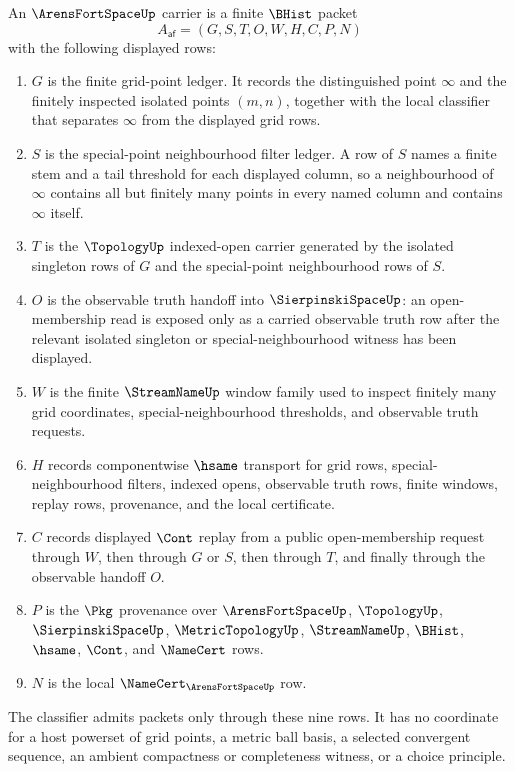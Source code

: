 \begin{definition}
\label{def:arens-fort-space-carrier}
An $\ArensFortSpaceUp$ carrier is a finite $\BHist$ packet
$$
A_{\mathsf{af}}=(G,S,T,O,W,H,C,P,N)
$$
with the following displayed rows:
\begin{enumerate}
\item $G$ is the finite grid-point ledger. It records the distinguished point $\infty$ and the finitely inspected isolated points $(m,n)$, together with the local classifier that separates $\infty$ from the displayed grid rows.
\item $S$ is the special-point neighbourhood filter ledger. A row of $S$ names a finite stem and a tail threshold for each displayed column, so a neighbourhood of $\infty$ contains all but finitely many points in every named column and contains $\infty$ itself.
\item $T$ is the $\TopologyUp$ indexed-open carrier generated by the isolated singleton rows of $G$ and the special-point neighbourhood rows of $S$.
\item $O$ is the observable truth handoff into $\SierpinskiSpaceUp$: an open-membership read is exposed only as a carried observable truth row after the relevant isolated singleton or special-neighbourhood witness has been displayed.
\item $W$ is the finite $\StreamNameUp$ window family used to inspect finitely many grid coordinates, special-neighbourhood thresholds, and observable truth requests.
\item $H$ records componentwise $\hsame$ transport for grid rows, special-neighbourhood filters, indexed opens, observable truth rows, finite windows, replay rows, provenance, and the local certificate.
\item $C$ records displayed $\Cont$ replay from a public open-membership request through $W$, then through $G$ or $S$, then through $T$, and finally through the observable handoff $O$.
\item $P$ is the $\Pkg$ provenance over $\ArensFortSpaceUp$, $\TopologyUp$, $\SierpinskiSpaceUp$, $\MetricTopologyUp$, $\StreamNameUp$, $\BHist$, $\hsame$, $\Cont$, and $\NameCert$ rows.
\item $N$ is the local $\NameCert_{\ArensFortSpaceUp}$ row.
\end{enumerate}
The classifier admits packets only through these nine rows. It has no coordinate for a host powerset of grid points, a metric ball basis, a selected convergent sequence, an ambient compactness or completeness witness, or a choice principle.
\end{definition}


